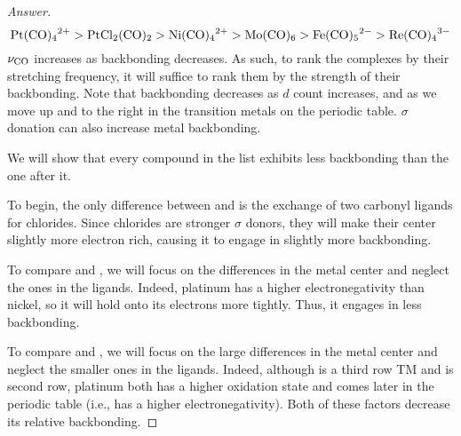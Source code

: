 \documentclass[../psets.tex]{subfiles}
\begin{document}
\begin{enumerate}
    \begin{proof}[Answer]

        \begin{equation*}
            \ce{Pt(CO)4^2+}
            > \ce{PtCl2(CO)2}
            > \ce{Ni(CO)4^2+}
            > \ce{Mo(CO)6}
            > \ce{Fe(CO)5^2-}
            > \ce{Re(CO)4^3-}
        \end{equation*}
        $\nu_{\ce{CO}}$ increases as backbonding decreases. As such, to rank the complexes by their  stretching frequency, it will suffice to rank them by the strength of their backbonding. Note that backbonding decreases as $d$ count increases, and as we move up and to the right in the transition metals on the periodic table.  $\sigma$ donation can also increase metal backbonding.\par\medskip
        We will show that every compound in the list exhibits less backbonding than the one after it.\par\smallskip
        To begin, the only difference between  and  is the exchange of two carbonyl ligands for chlorides. Since chlorides are stronger $\sigma$ donors, they will make their  center slightly more electron rich, causing it to engage in slightly more backbonding.\par
        To compare  and , we will focus on the differences in the metal center and neglect the ones in the ligands. Indeed, platinum has a higher electronegativity than nickel, so it will hold onto its electrons more tightly. Thus, it engages in less backbonding.\par
        To compare  and , we will focus on the large differences in the metal center and neglect the smaller ones in the ligands. Indeed, although  is a third row TM and  is second row, platinum both has a higher oxidation state and comes later in the periodic table (i.e., has a higher electronegativity). Both of these factors decrease its relative backbonding.\par

\end{proof}
\end{enumerate}
\end{document}
